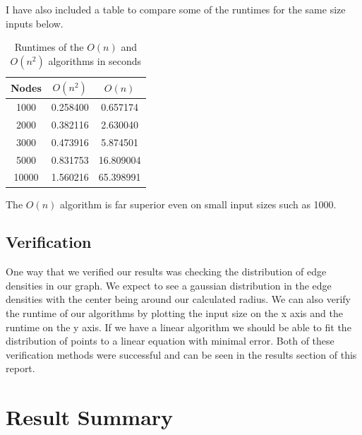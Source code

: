 \documentclass{article}
\begin{document}
	  I have also included a table to compare some of the runtimes for the same size inputs below.

	  \begin{center}
	  \begin{table}[H]
		\begin{tabular}{ |c|c|c| }
			\hline
			Nodes & $O(n^2)$ & $O(n)$ \\
			\hline
			  1000 & 0.258400 & 0.657174 \\
			  \hline
			  2000 & 0.382116 & 2.630040 \\
			  \hline
			  3000 & 0.473916 & 5.874501 \\
			  \hline
			  5000 & 0.831753 & 16.809004 \\
			  \hline
			  10000 & 1.560216 & 65.398991 \\
			\hline
		\end{tabular}
		\caption{Runtimes of the $O(n)$ and $O(n^2)$ algorithms in seconds}
	  \end{table}
	  \end{center}

	  The $O(n)$ algorithm is far superior even on small input sizes such as 1000.

	\subsection{Verification}
		One way that we verified our results was checking the distribution of edge densities in our graph.
		We expect to see a gaussian distribution in the edge densities with the center being around our calculated radius.
		We can also verify the runtime of our algorithms by plotting the input size on the x axis and the runtime on the y axis.
		If we have a linear algorithm we should be able to fit the distribution of points to a linear equation with minimal error.
		Both of these verification methods were successful and can be seen in the results section of this report.

\section{Result Summary}
\end{document}

